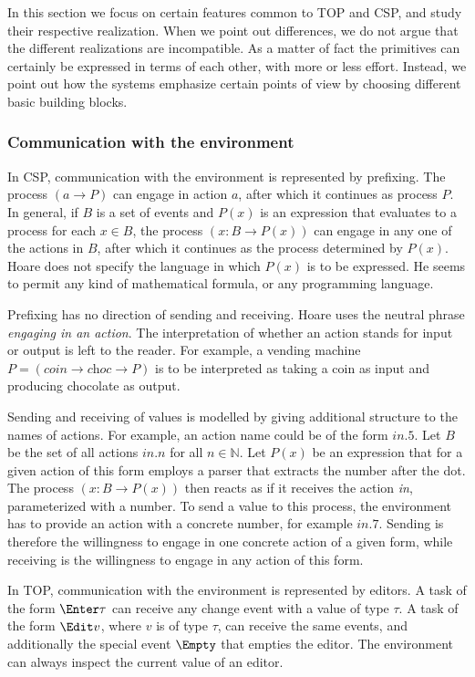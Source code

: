 In this section we focus on certain features common to TOP and CSP, and study their respective realization.
When we point out differences, we do not argue that the different realizations are incompatible.
As a matter of fact the primitives can certainly be expressed in terms of each other, with more or less effort.
Instead, we point out how the systems emphasize certain points of view by choosing different basic building blocks.


\subsubsection*{Communication with the environment}

In CSP, communication with the environment is represented by prefixing.
The process $(a \to P)$ can engage in action $a$, after which it continues as process $P$.
In general, if $B$ is a set of events and $P(x)$ is an expression that evaluates to a process for each $x \in B$, the process $(x:B \to P(x))$ can engage in any one of the actions in $B$, after which it continues as the process determined by $P(x)$.
Hoare does not specify the language in which $P(x)$ is to be expressed.
He seems to permit any kind of mathematical formula, or any programming language.

Prefixing has no direction of sending and receiving.
Hoare uses the neutral phrase \emph{engaging in an action}.
The interpretation of whether an action stands for input or output is left to the reader.
For example, a vending machine $P = (\textit{coin} \to \textit{choc} \to P)$ is to be interpreted as taking a coin as input and producing chocolate as output.

Sending and receiving of values is modelled by giving additional structure to the names of actions.
For example, an action name could be of the form $\textit{in}.5$.
Let $B$ be the set of all actions $\textit{in}.n$ for all $n \in \mathbb{N}$.
Let $P(x)$ be an expression that for a given action of this form employs a parser that extracts the number after the dot.
The process $(x:B \to P(x))$ then reacts as if it receives the action \textit{in}, parameterized with a number.
To send a value to this process, the environment has to provide an action with a concrete number, for example $\textit{in}.7$.
Sending is therefore the willingness to engage in one concrete action of a given form, while receiving is the willingness to engage in any action of this form.

In TOP, communication with the environment is represented by editors.
A task of the form $\Enter \tau$ can receive any change event with a value of type $\tau$.
A task of the form $\Edit v$, where $v$ is of type $\tau$, can receive the same
events, and additionally the special event $\Empty$ that empties the editor.
The environment can always inspect the current value of an editor.

